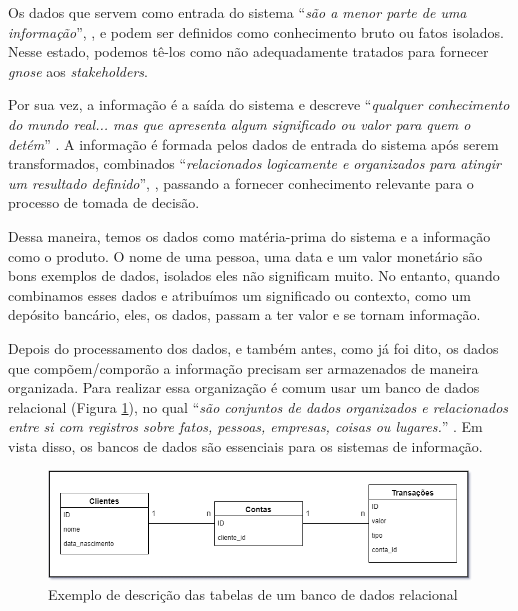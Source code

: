 Os dados que servem como entrada do sistema \enquote{\textit{são a menor parte de uma informação}}, \cite{boscarioli2016mineracao}, e podem ser definidos como conhecimento bruto ou fatos isolados. Nesse estado, podemos tê-los como não adequadamente tratados para fornecer \textit{gnose} aos \textit{stakeholders}.

Por sua vez, a informação é a saída do sistema e descreve \enquote{\textit{qualquer conhecimento do mundo real... mas que apresenta algum significado ou valor para quem o detém}} \cite{boscarioli2016mineracao}. A informação é formada pelos dados de entrada do sistema após serem transformados, combinados \enquote{\textit{relacionados logicamente e organizados para atingir um resultado definido}}, \cite{vida2021datawarehouse}, passando a fornecer conhecimento relevante para o processo de tomada de decisão.

Dessa maneira, temos os dados como matéria-prima do sistema e a informação como o produto. O nome de uma pessoa, uma data e um valor monetário são bons exemplos de dados, isolados eles não significam muito. No entanto, quando combinamos esses dados e atribuímos um significado ou contexto, como um depósito bancário, eles, os dados, passam a ter valor e se tornam informação.

Depois do processamento dos dados, e também antes, como já foi dito, os dados que compõem/comporão a informação precisam ser armazenados de maneira organizada. Para realizar essa organização é comum usar um banco de dados relacional (Figura \ref{fig:bancoDadosRelacional}), no qual \enquote{\textit{são conjuntos de dados organizados e relacionados entre si com registros sobre fatos, pessoas, empresas, coisas ou lugares.}} \cite{rezende2015obi}. Em vista disso, os bancos de dados são essenciais para os sistemas de informação.

\begin{figure}[ht]
\centering
\includegraphics[width=1\textwidth]{imagens/banco-relacional.png}
\caption{Exemplo de descrição das tabelas de um banco de dados relacional}
\label{fig:bancoDadosRelacional}
\end{figure}

